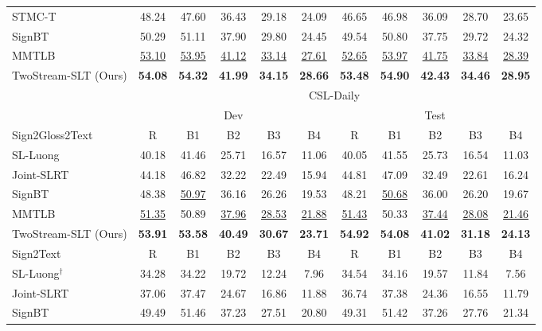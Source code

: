 \documentclass{article}
\begin{document}
\begin{table}[t]
{\begin{tabular}{l|c c c c c|c c c c c}
    STMC-T~\cite{STMC_MM} &48.24 & 47.60 & 36.43 & 29.18 & 24.09 & 46.65 & 46.98 & 36.09 & 28.70 & 23.65 \\
    SignBT~\cite{zhou2021improving} & 50.29 & 51.11 & 37.90 & 29.80 & 24.45 & 49.54 & 50.80 & 37.75 & 29.72 & 24.32 \\
    MMTLB~\cite{MMTLB_2022} &\underline{53.10} & \underline{53.95} & \underline{41.12} & \underline{33.14} & \underline{27.61} & \underline{52.65} & \underline{53.97} & \underline{41.75} & \underline{33.84} & \underline{28.39} \\
    TwoStream-SLT (Ours) &\textbf{54.08}&\textbf{54.32}&\textbf{41.99}&\textbf{34.15}&\textbf{28.66}&\textbf{53.48}&\textbf{54.90}&\textbf{42.43}&\textbf{34.46}&\textbf{28.95}\\ 
    \bottomrule
    \toprule
& \multicolumn{10}{c}{CSL-Daily}  \\
    &\multicolumn{5}{c|}{Dev}& \multicolumn{5}{c}{Test}\\
    Sign2Gloss2Text&R&B1&B2&B3&B4&R&B1&B2&B3&B4\\
    \midrule
    SL-Luong~\cite{camgoz2018neural} & 40.18 & 41.46 & 25.71 & 16.57 & 11.06 & 40.05 & 41.55 & 25.73 & 16.54 & 11.03 \\
    Joint-SLRT~\cite{camgoz2020sign} & 44.18 & 46.82 & 32.22 & 22.49 & 15.94 & 44.81 & 47.09 & 32.49 & 22.61 & 16.24 \\
    SignBT~\cite{zhou2021improving} & 48.38 & \underline{50.97} & 36.16 & 26.26 & 19.53 & 48.21 & \underline{50.68} & 36.00 & 26.20 & 19.67 \\
    MMTLB~\cite{MMTLB_2022} & \underline{51.35} & 50.89 & \underline{37.96} & \underline{28.53} & \underline{21.88} & \underline{51.43} & 50.33 & \underline{37.44} & \underline{28.08} & \underline{21.46} \\
    TwoStream-SLT (Ours) &  \textbf{53.91} & \textbf{53.58} & \textbf{40.49} & \textbf{30.67} & \textbf{23.71} & \textbf{54.92} & \textbf{54.08} & \textbf{41.02} & \textbf{31.18} & \textbf{24.13} \\
    \midrule
    Sign2Text&R&B1&B2&B3&B4&R&B1&B2&B3&B4\\
    \midrule
    SL-Luong$^{\dagger}$~\cite{camgoz2018neural} & 34.28 & 34.22 & 19.72 & 12.24 & 7.96 & 34.54 & 34.16 & 19.57 & 11.84 & 7.56 \\
    Joint-SLRT~\cite{camgoz2020sign} & 37.06 & 37.47 & 24.67 & 16.86 & 11.88 & 36.74 & 37.38 & 24.36 & 16.55 & 11.79 \\
    SignBT~\cite{zhou2021improving} & 49.49 & 51.46 & 37.23 & 27.51 & 20.80 & 49.31 & 51.42 & 37.26 & 27.76 & 21.34 \\

\end{tabular}}
\end{table}
\end{document}
